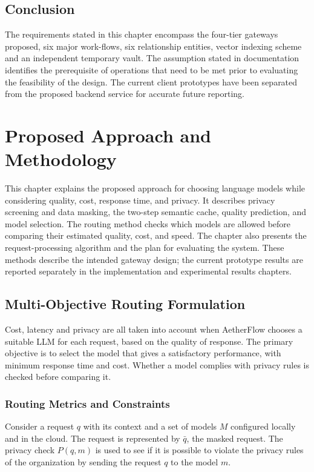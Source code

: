 \documentclass{FastFyp}
\begin{document}
\section{Conclusion}
\label{sec:ch4-conclusion}
The requirements stated in this chapter encompass the four-tier gateways proposed, six major work-flows, six relationship entities, vector indexing scheme and an independent temporary vault. The assumption stated in documentation identifies the prerequisite of operations that need to be met prior to evaluating the feasibility of the design. The current client prototypes have been separated from the proposed backend service for accurate future reporting.


\chapter{Proposed Approach and Methodology}
\label{ch:methodology}

This chapter explains the proposed approach for choosing language models while considering quality, cost, response time, and privacy. It describes privacy screening and data masking, the two-step semantic cache, quality prediction, and model selection. The routing method checks which models are allowed before comparing their estimated quality, cost, and speed. The chapter also presents the request-processing algorithm and the plan for evaluating the system. These methods describe the intended gateway design; the current prototype results are reported separately in the implementation and experimental results chapters.

\section{Multi-Objective Routing Formulation}
\label{sec:formal-formulation}

Cost, latency and privacy are all taken into account when AetherFlow chooses a suitable LLM for each request, based on the quality of response. The primary objective is to select the model that gives a satisfactory performance, with minimum response time and cost. Whether a model complies with privacy rules is checked before comparing it.

\subsection{Routing Metrics and Constraints}

Consider a request $q$ with its context and a set of models $M$ configured locally and in the cloud. The request is represented by $\bar{q}$, the masked request. The privacy check $P(q,m)$ is used to see if it is possible to violate the privacy rules of the organization by sending the request $q$ to the model $m$.
\end{document}
